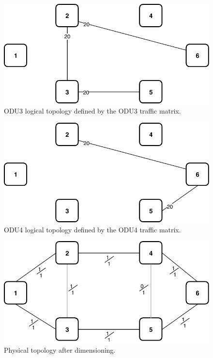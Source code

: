 \begin{figure}[h!]
\centering
\includegraphics[width=12cm]{sdf/ilp/translucent_survivability/figures/logical_topology_ODU3_high}
\caption{ODU3 logical topology defined by the ODU3 traffic matrix.}
\label{logical3_ODU3_high}
\end{figure}

\begin{figure}[h!]
\centering
\includegraphics[width=12cm]{sdf/ilp/translucent_survivability/figures/logical_topology_ODU4_high}
\caption{ODU4 logical topology defined by the ODU4 traffic matrix.}
\label{logical3_ODU4_high}
\end{figure}
\newpage
\begin{figure}[h!]
\centering
\includegraphics[width=12cm]{sdf/ilp/translucent_survivability/figures/physical_topology_high}
\caption{Physical topology after dimensioning.}
\label{physical3_high}
\end{figure}

